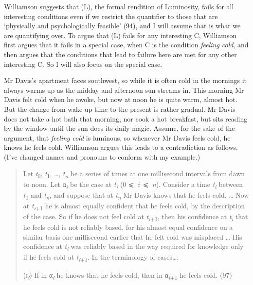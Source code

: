\documentclass[
  10pt,
  letterpaper,
  DIV=11,
  numbers=noendperiod,
  twoside]{scrartcl}
\begin{document}
Williamson suggests that (L), the formal rendition of Luminosity, fails
for all interesting conditions even if we restrict the quantifier to
those that are `physically and psychologically feasible' (94), and I
will assume that is what we are quantifying over. To argue that (L)
fails for any interesting C, Williamson first argues that it fails in a
special case, when C is the condition \emph{feeling cold}, and then
argues that the conditions that lead to failure here are met for any
other interesting C. So I will also focus on the special case.

Mr Davis's apartment faces southwest, so while it is often cold in the
mornings it always warms up as the midday and afternoon sun streams in.
This morning Mr Davis felt cold when he awoke, but now at noon he is
quite warm, almost hot. But the change from wake-up time to the present
is rather gradual. Mr Davis does not take a hot bath that morning, nor
cook a hot breakfast, but sits reading by the window until the sun does
its daily magic. Assume, for the sake of the argument, that
\emph{feeling cold} is luminous, so whenever Mr Davis feels cold, he
knows he feels cold. Williamson argues this leads to a contradiction as
follows. (I've changed names and pronouns to conform with my example.)

\begin{quote}
Let \emph{t}\textsubscript{0}, \emph{t}\textsubscript{1}, \ldots,
\emph{t\textsubscript{n}} be a series of times at one millisecond
intervals from dawn to noon. Let α\textsubscript{\emph{i}} be the case
at \emph{t\textsubscript{i}} (0 ⩽~\emph{i}~⩽~\emph{n}). Consider a time
\emph{t\textsubscript{i}} between \emph{t}\textsubscript{0} and
\emph{t\textsubscript{n}}, and suppose that at \emph{t\textsubscript{n}}
Mr Davis knows that he feels cold. \ldots{} Now at
\emph{t\textsubscript{i}}\textsubscript{+1} he is almost equally
confident that he feels cold, by the description of the case. So if he
does not feel cold at \emph{t\textsubscript{i}}\textsubscript{+1}, then
his confidence at \emph{t\textsubscript{i}} that he feels cold is not
reliably based, for his almost equal confidence on a similar basis one
millisecond earlier that he felt cold was misplaced \ldots{} His
confidence at \emph{t\textsubscript{i}} was reliably based in the way
required for knowledge only if he feels cold at
\emph{t\textsubscript{i}}\textsubscript{+1}. In the terminology of
cases\ldots:

(\textsc{i}\textsubscript{\emph{i}}) If in α\textsubscript{\emph{i}} he
knows that he feels cold, then in α\textsubscript{\emph{i}+1} he feels
cold. (97)
\end{quote}
\end{document}
